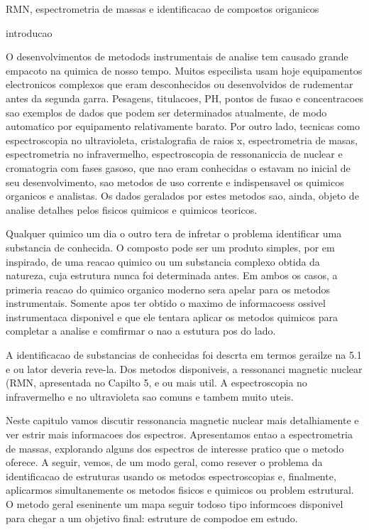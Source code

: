 RMN, espectrometria de massas e identificacao de compostos origanicos

introducao

O desenvolvimentos de metodods instrumentais de analise tem causado grande empacoto na quimica de nosso tempo. Muitos especilista usam hoje equipamentos electronicos complexos que eram desconhecidos ou desenvolvidos de rudementar antes da segunda garra. Pesagens, titulacoes, PH, pontos de fusao  e concentracoes sao exemplos de dados que podem ser determinados atualmente, de modo automatico por equipamento relativamente barato. Por outro lado, tecnicas como espectroscopia no ultravioleta, cristalografia de raios x, espectrometria de masas, espectrometria no infravermelho, espectroscopia de ressonaniccia de nuclear e cromatogria com fases gasoso, que nao eram conhecidas o estavam no inicial de seu desenvolvimento, sao metodos de uso corrente e indispensavel os quimicos organicos e analistas. Os dados geralados por estes metodos sao, ainda, objeto de analise detalhes pelos fisicos quimicos e quimicos teoricos. 

Qualquer quimico um dia o outro tera de infretar o problema identificar uma substancia de conhecida. O composto pode ser um produto simples, por em inspirado, de uma reacao quimico ou um substancia complexo obtida da natureza, cuja estrutura nunca foi determinada antes. Em ambos os casos, a primeria reacao do quimico organico moderno sera apelar para os metodos instrumentais. Somente apos ter obtido o maximo de informacoess ossivel instrumentaca disponivel e que ele tentara aplicar os metodos quimicos para completar a analise e comfirmar o nao a estutura pos do lado. 

A identificacao de substancias de conhecidas foi descrta em termos gerailze na 5.1 e ou lator deveria reve-la. Dos metodos disponiveis, a ressonanci magnetic nuclear (RMN, apresentada no Capilto 5, e ou mais util. A espectroscopia no infravermelho e no ultravioleta sao comuns e tambem muito uteis. 

Neste capitulo vamos discutir ressonancia magnetic nuclear mais detalhiamente e ver estrir mais informacoes dos espectros. Apresentamos entao a espectrometria de massas, explorando alguns dos espectros de interesse pratico que o metodo oferece. A seguir, vemos, de um modo geral, como resever o problema da identificacao de estruturas usando os metodos espectroscopias e, finalmente, aplicarmos simultanemente os metodos fisicos e quimicos ou problem estrutural. O metodo geral eseninente um mapa seguir todoso tipo informcoes disponivel para chegar a um objetivo final: estruture de compodoe em estudo.

